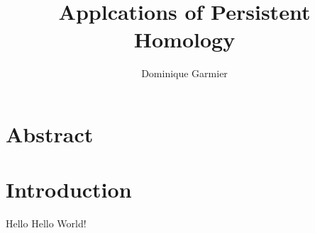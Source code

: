 \documentclass{article}
\title{Applcations of Persistent Homology}
\author{Dominique Garmier }
\begin{document}
\maketitle

\section{Abstract}
\section{Introduction}

Hello Hello World!
\end{document}

